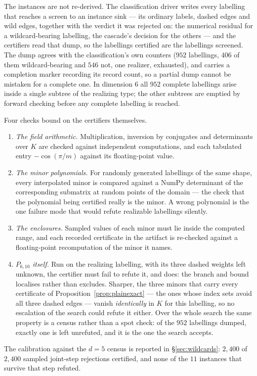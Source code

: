 \documentclass[11pt,reqno]{amsart}
\theoremstyle{plain}
\theoremstyle{definition}
\newcommand{\PP}{P_{6,10}}
\newcommand{\DFiveWildCert}{2{,}400}
\newcommand{\DFiveWildScreenPass}{11}
\newcommand{\DFiveWildJointKilled}{2{,}400}
\newcommand{\NumPlain}{546}
\newcommand{\NumWild}{406}
\newcommand{\NumAssignments}{952}
\begin{document}
The instances are not re-derived. The classification driver writes every labelling
that reaches a screen to an instance sink --- its ordinary labels, dashed edges and
wild edges, together with the verdict it was rejected on: the numerical residual
for a wildcard-bearing labelling, the cascade's decision for the others --- and the
certifiers read that dump, so the labellings certified are the labellings screened.
The dump agrees with the classification's own counters
($\NumAssignments$ labellings, $\NumWild$ of them wildcard-bearing and $\NumPlain$
not, one realizer, exhausted), and carries a completion marker recording its record
count, so a partial dump cannot be mistaken for a complete one. In dimension $6$
all $\NumAssignments$ complete labellings arise inside a single subtree of the
realizing type; the other subtrees are emptied by forward checking before any
complete labelling is reached.

Four checks bound on the certifiers themselves.
\begin{enumerate}
\item \emph{The field arithmetic.} Multiplication, inversion by conjugates and
      determinants over $K$ are checked against independent computations, and each
      tabulated entry $-\cos(\pi/m)$ against its floating-point value.
\item \emph{The minor polynomials.} For randomly generated labellings of the same
      shape, every interpolated minor is compared against a NumPy determinant of
      the corresponding submatrix at random points of the domain --- the check that
      the polynomial being certified really is the minor. A wrong polynomial is the
      one failure mode that would refute realizable labellings silently.
\item \emph{The enclosures.} Sampled values of each minor must lie inside the
      computed range, and each recorded certificate in the artifact is
      re-checked against a floating-point recomputation of the minor it names.
\item \emph{$\PP$ itself.} Run on the realizing labelling, with its three dashed
      weights left unknown, the certifier must fail to refute it, and does: the
      branch and bound localises rather than excludes. Sharper, the three minors
      that carry every certificate of Proposition~\ref{prop:plainexact} --- the ones
      whose index sets avoid all three dashed edges --- vanish \emph{identically} in
      $K$ for this labelling, so no escalation of the search could refute it either.
      Over the whole search the same property is a census rather than a spot check:
      of the $\NumAssignments$ labellings dumped, exactly one is left unrefuted, and
      it is the one the search accepts.
\end{enumerate}
The calibration against the $d=5$ census is reported in \S\ref{sec:wildcards}:
$\DFiveWildCert$ of $\DFiveWildJointKilled$ sampled joint-step rejections
certified, and none of the $\DFiveWildScreenPass$ instances that survive that step
refuted.
\end{document}
